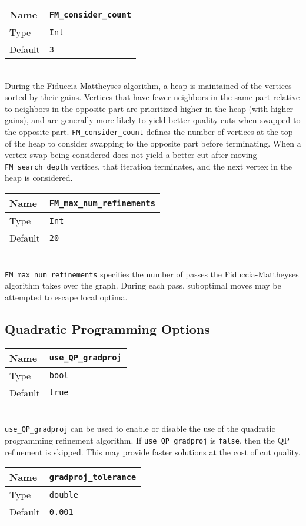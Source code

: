 \documentclass[letter]{article}
\begin{document}
\baselineskip
\begin{tabular}{|l|l|} \hline
Name & \texttt{FM\_consider\_count} \\ \hline
Type & \texttt{Int} \\ \hline
Default & \texttt{3} \\ \hline
\end{tabular}\\

During the Fiduccia-Mattheyses algorithm, a heap is maintained of the vertices sorted by their gains. Vertices that have fewer neighbors in the same part relative to neighbors in the opposite part are prioritized higher in the heap (with higher gains), and are generally more likely to yield better quality cuts when swapped to the opposite part. \texttt{FM\_consider\_count} defines the number of vertices at the top of the heap to consider swapping to the opposite part before terminating. When a vertex swap being considered does not yield a better cut after moving \texttt{FM\_search\_depth} vertices, that iteration terminates, and the next vertex in the heap is considered.

\baselineskip
\begin{tabular}{|l|l|} \hline
Name & \texttt{FM\_max\_num\_refinements} \\ \hline
Type & \texttt{Int} \\ \hline
Default & \texttt{20} \\ \hline
\end{tabular}\\

\texttt{FM\_max\_num\_refinements} specifies the number of passes the Fiduccia-Mattheyses algorithm takes over the graph. During each pass, suboptimal moves may be attempted to escape local optima.

\subsection{Quadratic Programming Options}

\begin{tabular}{|l|l|} \hline
Name & \texttt{use\_QP\_gradproj} \\ \hline
Type & \texttt{bool} \\ \hline
Default & \texttt{true} \\ \hline
\end{tabular}\\

\texttt{use\_QP\_gradproj} can be used to enable or disable the use of the quadratic programming refinement algorithm. If \texttt{use\_QP\_gradproj} is \texttt{false}, then the QP refinement is skipped. This may provide faster solutions at the cost of cut quality.\\
\baselineskip
\begin{tabular}{|l|l|} \hline
Name & \texttt{gradproj\_tolerance} \\ \hline
Type & \texttt{double} \\ \hline
Default & \texttt{0.001} \\ \hline
\end{tabular}\\
\end{document}
